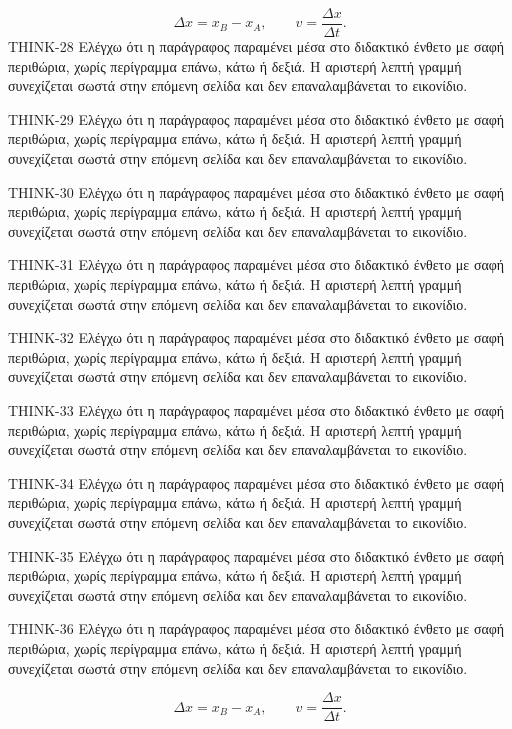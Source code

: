 \begin{ThinkBox}
\[\Delta x=x_B-x_A,\qquad v=\frac{\Delta x}{\Delta t}.\]
THINK-28 Ελέγχω ότι η παράγραφος παραμένει μέσα στο διδακτικό ένθετο με σαφή περιθώρια, χωρίς περίγραμμα επάνω, κάτω ή δεξιά. Η αριστερή λεπτή γραμμή συνεχίζεται σωστά στην επόμενη σελίδα και δεν επαναλαμβάνεται το εικονίδιο.\par
THINK-29 Ελέγχω ότι η παράγραφος παραμένει μέσα στο διδακτικό ένθετο με σαφή περιθώρια, χωρίς περίγραμμα επάνω, κάτω ή δεξιά. Η αριστερή λεπτή γραμμή συνεχίζεται σωστά στην επόμενη σελίδα και δεν επαναλαμβάνεται το εικονίδιο.\par
THINK-30 Ελέγχω ότι η παράγραφος παραμένει μέσα στο διδακτικό ένθετο με σαφή περιθώρια, χωρίς περίγραμμα επάνω, κάτω ή δεξιά. Η αριστερή λεπτή γραμμή συνεχίζεται σωστά στην επόμενη σελίδα και δεν επαναλαμβάνεται το εικονίδιο.\par
THINK-31 Ελέγχω ότι η παράγραφος παραμένει μέσα στο διδακτικό ένθετο με σαφή περιθώρια, χωρίς περίγραμμα επάνω, κάτω ή δεξιά. Η αριστερή λεπτή γραμμή συνεχίζεται σωστά στην επόμενη σελίδα και δεν επαναλαμβάνεται το εικονίδιο.\par
THINK-32 Ελέγχω ότι η παράγραφος παραμένει μέσα στο διδακτικό ένθετο με σαφή περιθώρια, χωρίς περίγραμμα επάνω, κάτω ή δεξιά. Η αριστερή λεπτή γραμμή συνεχίζεται σωστά στην επόμενη σελίδα και δεν επαναλαμβάνεται το εικονίδιο.\par
THINK-33 Ελέγχω ότι η παράγραφος παραμένει μέσα στο διδακτικό ένθετο με σαφή περιθώρια, χωρίς περίγραμμα επάνω, κάτω ή δεξιά. Η αριστερή λεπτή γραμμή συνεχίζεται σωστά στην επόμενη σελίδα και δεν επαναλαμβάνεται το εικονίδιο.\par
THINK-34 Ελέγχω ότι η παράγραφος παραμένει μέσα στο διδακτικό ένθετο με σαφή περιθώρια, χωρίς περίγραμμα επάνω, κάτω ή δεξιά. Η αριστερή λεπτή γραμμή συνεχίζεται σωστά στην επόμενη σελίδα και δεν επαναλαμβάνεται το εικονίδιο.\par
THINK-35 Ελέγχω ότι η παράγραφος παραμένει μέσα στο διδακτικό ένθετο με σαφή περιθώρια, χωρίς περίγραμμα επάνω, κάτω ή δεξιά. Η αριστερή λεπτή γραμμή συνεχίζεται σωστά στην επόμενη σελίδα και δεν επαναλαμβάνεται το εικονίδιο.\par
THINK-36 Ελέγχω ότι η παράγραφος παραμένει μέσα στο διδακτικό ένθετο με σαφή περιθώρια, χωρίς περίγραμμα επάνω, κάτω ή δεξιά. Η αριστερή λεπτή γραμμή συνεχίζεται σωστά στην επόμενη σελίδα και δεν επαναλαμβάνεται το εικονίδιο.\par
\[\Delta x=x_B-x_A,\qquad v=\frac{\Delta x}{\Delta t}.\]
\end{ThinkBox}
\clearpage
